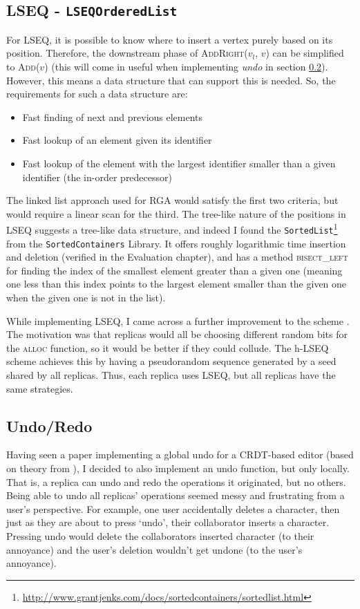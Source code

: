 \documentclass[diss.tex]{subfiles}
\begin{document}
\subsection{LSEQ - \texttt{LSEQOrderedList}}

For LSEQ, it is possible to know where to insert a vertex purely based on its position. Therefore, the downstream phase of \textsc{AddRight($v_l$, $v$)} can be simplified to \textsc{Add($v$)} (this will come in useful when implementing \textit{undo} in section \ref{sec:undo}). However, this means a data structure that can support this is needed. So, the requirements for such a data structure are:
\begin{itemize}
\item Fast finding of next and previous elements
\item Fast lookup of an element given its identifier
\item Fast lookup of the element with the largest identifier smaller than a given identifier (the in-order predecessor)
\end{itemize}
The linked list approach used for RGA would satisfy the first two criteria, but would require a linear scan for the third. The tree-like nature of the positions in LSEQ suggests a tree-like data structure, and indeed I found the \texttt{SortedList}\footnote{\url{http://www.grantjenks.com/docs/sortedcontainers/sortedlist.html}} from the \texttt{SortedContainers} Library. It offers roughly logarithmic time insertion and deletion (verified in the Evaluation chapter), and has a method \textsc{bisect\_left} for finding the index of the smallest element greater than a given one (meaning one less than this index points to the largest element smaller than the given one when the given one is not in the list).

While implementing LSEQ, I came across a further improvement to the scheme \cite{hlseq}. The motivation was that replicas would all be choosing different random bits for the \textsc{alloc} function, so it would be better if they could collude. The h-LSEQ scheme achieves this by having a pseudorandom sequence generated by a seed shared by all replicas. Thus, each replica uses LSEQ, but all replicas have the same strategies.


\subsection{Undo/Redo}\label{sec:undo}
Having seen a paper implementing a global undo for a CRDT-based editor \cite{logootundo} (based on theory from \cite{undoatanytime}), I decided to also implement an undo function, but only locally. That is, a replica can undo and redo the operations it originated, but no others. Being able to undo all replicas' operations seemed messy and frustrating from a user's perspective. For example, one user accidentally deletes a character, then just as they are about to press `undo', their collaborator inserts a character. Pressing undo would delete the collaborators inserted character (to their annoyance) and the user's deletion wouldn't get undone (to the user's annoyance). 
\end{document}
